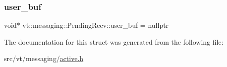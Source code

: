 \mbox{\label{structvt_1_1messaging_1_1_pending_recv_a18d11f650583c3da5a7362e0c998be5d}} 
\subsubsection{\texorpdfstring{user\+\_\+buf}{user\_buf}}
{\footnotesize\ttfamily void$\ast$ vt\+::messaging\+::\+Pending\+Recv\+::user\+\_\+buf = nullptr}



The documentation for this struct was generated from the following file\+:\begin{DoxyCompactItemize}
\item 
src/vt/messaging/\hyperlink{active_8h}{active.\+h}\end{DoxyCompactItemize}
